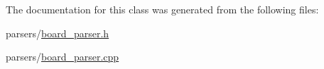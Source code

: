 The documentation for this class was generated from the following files\-:\begin{DoxyCompactItemize}
\item 
parsers/\hyperlink{board__parser_8h}{board\-\_\-parser.\-h}\item 
parsers/\hyperlink{board__parser_8cpp}{board\-\_\-parser.\-cpp}\end{DoxyCompactItemize}
